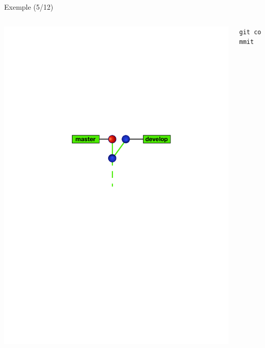 \begin{frame}[fragile]{%
\protect\hypertarget{exemple-512}{%
Exemple (5/12)}}

\begin{columns}[T]
\begin{column}{0.40\textwidth}
\includegraphics[width=1\textwidth]{images/branch5.pdf}
\end{column}

\begin{column}{0.60\textwidth}
\texttt{git\ commit}
\end{column}
\end{columns}

\end{frame}

